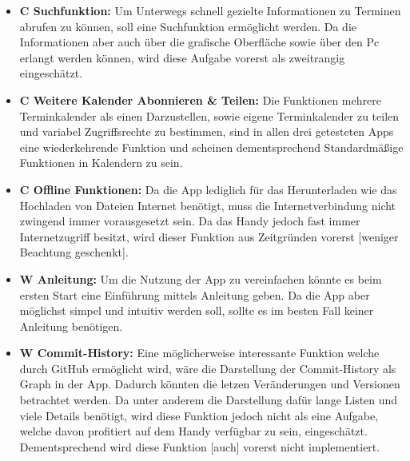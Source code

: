 \begin{itemize}
	\item \textbf{C Suchfunktion:} %
		Um Unterwegs schnell gezielte Informationen zu Terminen abrufen zu können, soll eine Suchfunktion ermöglicht werden. %
		Da die Informationen aber auch über die grafische Oberfläche sowie über den Pc erlangt werden können, wird diese Aufgabe vorerst als zweitrangig eingeschätzt.%

	\item \textbf{C Weitere Kalender Abonnieren \& Teilen:} %
		Die Funktionen mehrere Terminkalender als einen Darzustellen, sowie eigene Terminkalender zu teilen und variabel Zugriffsrechte zu bestimmen, sind in allen drei getesteten Apps eine wiederkehrende Funktion und scheinen dementsprechend Standardmäßige Funktionen in Kalendern zu sein. %
		
	\item \textbf{C Offline Funktionen:} %
		Da die App lediglich für das Herunterladen wie das Hochladen von Dateien Internet benötigt, muss die Internetverbindung nicht zwingend immer vorausgesetzt sein. %
		Da das Handy jedoch fast immer Internetzugriff besitzt, wird dieser Funktion aus Zeitgründen vorerst [weniger Beachtung geschenkt].%

	\item \textbf{W Anleitung:} %
		Um die Nutzung der App zu vereinfachen könnte es beim ersten Start eine Einführung mittels Anleitung geben. %
		Da die App aber möglichst simpel und intuitiv werden soll, sollte es im besten Fall keiner Anleitung benötigen.%


	\item \textbf{W Commit-History:} %
		Eine möglicherweise interessante Funktion welche durch GitHub ermöglicht wird, wäre die Darstellung der Commit-History als Graph in der App. Dadurch könnten die letzen Veränderungen und Versionen betrachtet werden. %
		Da unter anderem die Darstellung dafür lange Listen und viele Details benötigt, wird diese Funktion jedoch nicht als eine Aufgabe, welche davon profitiert auf dem Handy verfügbar zu sein, eingeschätzt. %
		Dementsprechend wird diese Funktion [auch] vorerst nicht implementiert.%



\end{itemize}
